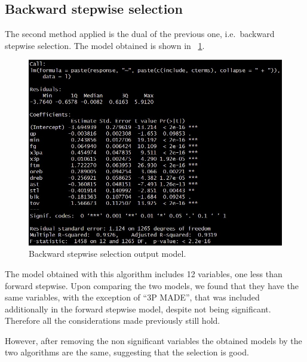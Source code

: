 \subsection{Backward stepwise selection}

The second method applied is the dual of the previous one, i.e.\ backward stepwise selection. The model obtained is shown in \Fig~\ref{fig:BackwardModelSummary}.
\begin{figure}[h]
	\centering
	\includegraphics[width=0.35\linewidth]{ImageFiles/Regression/Backward/BackwardModelSummary}
	\caption{Backward stepwise selection output model.}
	\label{fig:BackwardModelSummary}
\end{figure}

The model obtained with this algorithm includes 12 variables, one less than forward stepwise. Upon comparing the two models, we found that they have the same variables, with the exception of ``3P MADE'', that was included additionally in the forward stepwise model, despite not being significant.
Therefore all the considerations made previously still hold.

However, after removing the non significant variables the obtained models by the two algorithms are the same, suggesting that the selection is good.